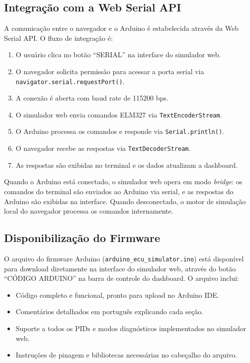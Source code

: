 \subsection{Integração com a Web Serial API}

A comunicação entre o navegador e o Arduino é estabelecida através da Web Serial API. O fluxo de integração é:

\begin{enumerate}
    \item O usuário clica no botão ``SERIAL'' na interface do simulador web.
    \item O navegador solicita permissão para acessar a porta serial via \texttt{navigator.serial.requestPort()}.
    \item A conexão é aberta com baud rate de 115200 bps.
    \item O simulador web envia comandos ELM327 via \texttt{TextEncoderStream}.
    \item O Arduino processa os comandos e responde via \texttt{Serial.println()}.
    \item O navegador recebe as respostas via \texttt{TextDecoderStream}.
    \item As respostas são exibidas no terminal e os dados atualizam a dashboard.
\end{enumerate}

Quando o Arduino está conectado, o simulador web opera em modo \textit{bridge}: os comandos do terminal são enviados ao Arduino via serial, e as respostas do Arduino são exibidas na interface. Quando desconectado, o motor de simulação local do navegador processa os comandos internamente.

\subsection{Disponibilização do Firmware}

O arquivo do firmware Arduino (\texttt{arduino\_ecu\_simulator.ino}) está disponível para download diretamente na interface do simulador web, através do botão ``CÓDIGO ARDUINO'' na barra de controle do dashboard. O arquivo inclui:

\begin{itemize}
    \item Código completo e funcional, pronto para upload no Arduino IDE.
    \item Comentários detalhados em português explicando cada seção.
    \item Suporte a todos os PIDs e modos diagnósticos implementados no simulador web.
    \item Instruções de pinagem e bibliotecas necessárias no cabeçalho do arquivo.
\end{itemize}

